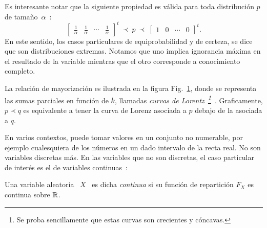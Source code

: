 Es  interesante  notar  que  la   siguiente  propiedad  es  v\'alida  para  toda
distribuci\'on $p$ de tama\~no~$\alpha$~\cite[p.~9,
  (6)-(8)]{MarOlk11}:
%
\[
\begin{bmatrix}     \frac1\alpha      &     \frac1\alpha     &      \cdots     &
  \frac1\alpha \end{bmatrix}^t  \ \prec \  p \ \prec  \ \begin{bmatrix} 1 &  0 &
  \cdots & 0 \end{bmatrix}^t.
\]
%
En este  sentido, los  casos particulares de  equiprobabilidad y de  certeza, se
dice  que  son  distribuciones  extremas.  Notamos que  uno  implica  ignorancia
m\'axima  en el  resultado de  la variable  mientras que  el otro  corresponde a
conocimiento completo.

La    relaci\'on    de    mayorizaci\'on    es   ilustrada    en    la    figura
Fig.~\ref{Fig:MP:mayorizacionplot}, donde  se representa las  sumas parciales en
funci\'on   de  $k$,   llamadas  {\em   curvas  de   Lorentz~\footnote{Se  proba
    sencillamente      que      estas      curvas     son      crecientes      y
    c\'oncavas.}}~\cite{MarOlk11,   Lor05}.  Graficamente,   $p   \prec  q$   es
equivalente a tener  la curva de Lorenz  asociada a $p$ debajo de  la asociada a
$q$.
%
\begin{figure}[h!]
\begin{center}  \end{center}
%
\label{Fig:MP:mayorizacionplot}
\end{figure}



\label{Ssec:MP:VAContinua}

En  varios contextos,  puede  tomar valores  en  un conjunto  no numerable,  por
ejemplo cualesquiera de los n\'umeros en un dado intervalo de la recta real.  No
son variables  discretas m\'as. En las  variables que no son  discretas, el caso
particular de inter\'es es el de variables continuas~\cite{AthLah06, HogMck13}:
%
\begin{definicion}
\label{Def:MP:VariableAleatoriaContinua}
%
  Una variable  aleatoria \  $X$ \ es  dicha {\it  continua} si su  funci\'on de
  repartici\'on  $F_X$ es  continua sobre  $\mathbb{R}$.
\end{definicion}

